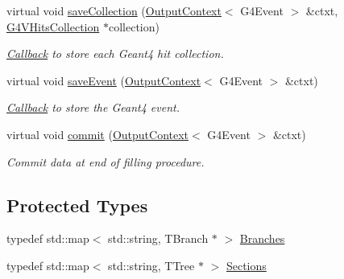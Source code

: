 \begin{DoxyCompactItemize}
virtual void \hyperlink{class_d_d4hep_1_1_simulation_1_1_geant4_output2_r_o_o_t_a1f61031bde79ed84a62145cb32ac4428}{saveCollection} (\hyperlink{class_d_d4hep_1_1_simulation_1_1_geant4_output_action_1_1_output_context}{OutputContext}$<$ G4Event $>$ \&ctxt, \hyperlink{class_g4_v_hits_collection}{G4VHitsCollection} $\ast$collection)
\begin{DoxyCompactList}\small\item\em \hyperlink{class_d_d4hep_1_1_callback}{Callback} to store each Geant4 hit collection. \item\end{DoxyCompactList}\item 
virtual void \hyperlink{class_d_d4hep_1_1_simulation_1_1_geant4_output2_r_o_o_t_a0562da9b5fdb0f81fa8d14457fd3f319}{saveEvent} (\hyperlink{class_d_d4hep_1_1_simulation_1_1_geant4_output_action_1_1_output_context}{OutputContext}$<$ G4Event $>$ \&ctxt)
\begin{DoxyCompactList}\small\item\em \hyperlink{class_d_d4hep_1_1_callback}{Callback} to store the Geant4 event. \item\end{DoxyCompactList}\item 
virtual void \hyperlink{class_d_d4hep_1_1_simulation_1_1_geant4_output2_r_o_o_t_a06090a17c7d266dcdfb7b2b180aeaffe}{commit} (\hyperlink{class_d_d4hep_1_1_simulation_1_1_geant4_output_action_1_1_output_context}{OutputContext}$<$ G4Event $>$ \&ctxt)
\begin{DoxyCompactList}\small\item\em Commit data at end of filling procedure. \item\end{DoxyCompactList}\end{DoxyCompactItemize}
\subsection*{Protected Types}
\begin{DoxyCompactItemize}
\item 
typedef std::map$<$ std::string, TBranch $\ast$ $>$ \hyperlink{class_d_d4hep_1_1_simulation_1_1_geant4_output2_r_o_o_t_a7c5890a17d3f70ce65703cdbec3cf53c}{Branches}
\item 
typedef std::map$<$ std::string, TTree $\ast$ $>$ \hyperlink{class_d_d4hep_1_1_simulation_1_1_geant4_output2_r_o_o_t_a6bee4e4ece80aae4e2e07295486f8cd0}{Sections}
\end{DoxyCompactItemize}
